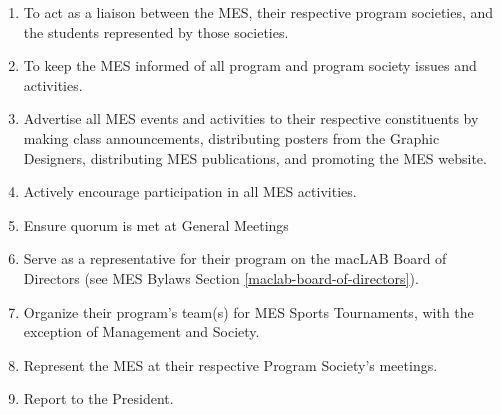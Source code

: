 \begin{enumerate}
  \begin{enumerate}
   \item
    To act as a liaison between the MES, their respective program societies, and the students represented by those societies.
   \item
    To keep the MES informed of all program and program society issues and activities.
   \item
    Advertise all MES events and activities to their respective constituents by making class announcements, distributing posters from the Graphic Designers, distributing MES publications, and promoting the MES website.
   \item
    Actively encourage participation in all MES activities.
   \item
    Ensure quorum is met at General Meetings
   \item
    Serve as a representative for their program on the macLAB Board of Directors (see MES Bylaws Section \ref{maclab-board-of-directors}).
   \item
    Organize their program's team(s) for MES Sports Tournaments, with the exception of Management and Society.
   \item
    Represent the MES at their respective Program Society's meetings.
   \item
    Report to the President.
  \end{enumerate}

\end{enumerate}


